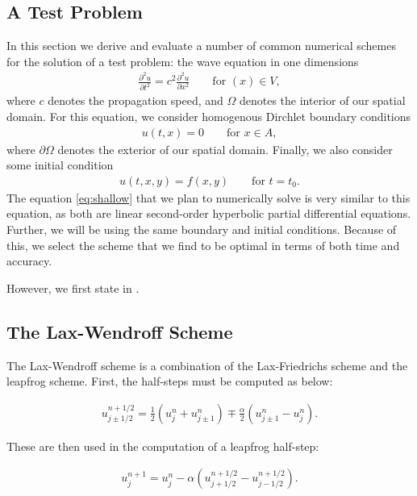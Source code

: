 \documentclass[../main.tex]{subfiles}
\begin{document}
\subsection{A Test Problem}
In this section we derive and evaluate a number of common numerical schemes for the solution of a test problem: the wave equation in one dimensions
\begin{gather}\label{eq:wave}
    \frac{\partial^2 u}{\partial t^2} = c^2\frac{\partial^2 u}{\partial x^2}\qquad\text{for }(x)\in V,
\end{gather}
where $c$ denotes the propagation speed, and $\Omega$ denotes the interior of our spatial domain. For this equation, we consider homogenous Dirchlet boundary conditions
\begin{gather}\label{eq:bcs}
    u(t,x) = 0\qquad\text{for }x\in A,
\end{gather}
where $\partial\Omega$ denotes the exterior of our spatial domain. Finally, we also consider some initial condition
\begin{gather}\label{eq:ic}
    u(t,x,y) = f(x,y)\qquad\text{for }t=t_0.
\end{gather}
The equation \ref{eq:shallow}  that we plan to numerically solve is very similar to this equation, as both are linear second-order hyperbolic partial differential equations. Further, we will be using the same boundary and initial conditions. Because of this, we select the scheme that we find to be optimal in terms of both time and accuracy.

\noindent However, we first state \label{eq:wave} in .

\subsection{The Lax-Wendroff Scheme}

The Lax-Wendroff scheme \cite{rezzolla} is a combination of the Lax-Friedrichs scheme and the leapfrog scheme. First, the half-steps must be computed as below:

\begin{gather}
	u^{n+1/2}_{j\pm1/2} = \frac{1}{2}(u^{n}_{j}+u^{n}_{j\pm1}) \mp \frac{\alpha}{2}(u^{n}_{j\pm1}-u^{n}_j).
\end{gather}

\noindent These are then used in the computation of a leapfrog half-step:

\begin{gather}
	u^{n+1}_{j} = u^{n}_{j}-\alpha(u^{n+1/2}_{j+1/2}-u^{n+1/2}_{j-1/2}).
\end{gather}
\end{document}
